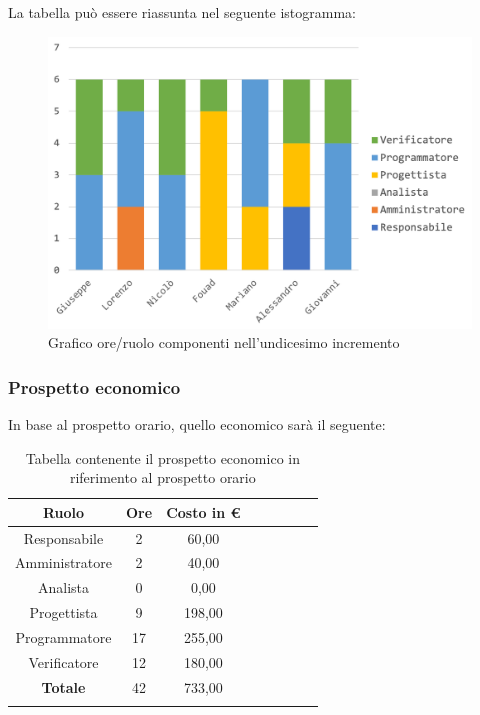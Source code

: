		La tabella può essere riassunta nel seguente istogramma:
		\begin{figure}[H]
			\centering
			\includegraphics[width=0.8\linewidth]{./images/preventivo/incremento11-1.png}
			\caption{Grafico ore/ruolo componenti nell'undicesimo incremento}
			\label{fig:grafico suddivione ruoli incremento XI}
		\end{figure}
		
		\subsubsection{Prospetto economico}
		In base al prospetto orario, quello economico sarà il seguente: 
		
		\begin{longtable}{|c|c|c|c|c|c|c|c|}
			\hline
			\rowcolor{lighter-grayer}
			\textbf{Ruolo} & \textbf{Ore} & \textbf{Costo in € } \\
			\hline
			\endfirsthead
			
			\hline
			Responsabile 	    & 2 & 60,00\\
			\hline 
			\hline
			Amministratore	   & 2 & 40,00\\
			\hline
			\hline
			Analista 				& 0 & 0,00\\
			\hline
			\hline
			Progettista 		   & 9 & 198,00\\
			\hline
			\hline
			Programmatore 	  & 17 & 255,00\\
			\hline
			\hline
			Verificatore 		   & 12 & 180,00\\
			\hline
			\textbf{Totale} 	 & 42 & 733,00\\
			\hline
			\caption{Tabella contenente il prospetto economico in riferimento al prospetto orario}
		\end{longtable}
		\pagebreak
		
